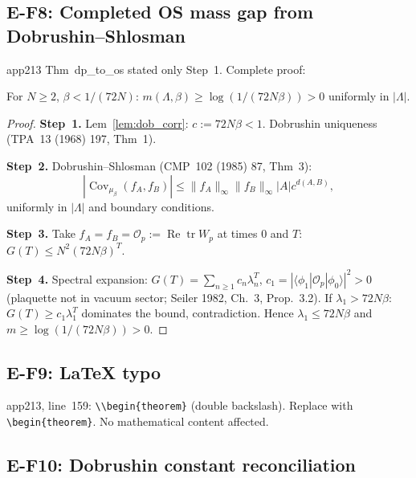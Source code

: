 \subsection{E-F8: Completed OS mass gap from Dobrushin--Shlosman}
\label{ssec:f8}

app213 Thm~dp\_to\_os stated only Step~1. Complete proof:

\begin{theorem}
\label{thm:dp_complete}
For $N\ge2$, $\beta<1/(72N)$: $m(\Lambda,\beta)\ge\log(1/(72N\beta))>0$ uniformly in $|\Lambda|$.
\end{theorem}

\begin{proof}
\textbf{Step~1.} Lem~\ref{lem:dob_corr}: $c:=72N\beta<1$. Dobrushin uniqueness (TPA~13 (1968) 197, Thm~1).

\textbf{Step~2.} Dobrushin--Shlosman (CMP~102 (1985) 87, Thm~3):
\begin{equation}
\label{eq:ds_decay}
  |\operatorname{Cov}_{\mu_\beta}(f_A,f_B)|\le\|f_A\|_\infty\|f_B\|_\infty|A|c^{d(A,B)},
\end{equation}
uniformly in $|\Lambda|$ and boundary conditions.

\textbf{Step~3.} Take $f_A=f_B=\mathcal{O}_p:=\operatorname{Re}\operatorname{tr}W_p$ at times $0$ and $T$: $G(T)\le N^2(72N\beta)^T$.

\textbf{Step~4.} Spectral expansion: $G(T)=\sum_{n\ge1}c_n\lambda_n^T$, $c_1=|\langle\phi_1|\mathcal{O}_p|\phi_0\rangle|^2>0$ (plaquette not in vacuum sector; Seiler 1982, Ch.~3, Prop.~3.2). If $\lambda_1>72N\beta$: $G(T)\ge c_1\lambda_1^T$ dominates the bound, contradiction. Hence $\lambda_1\le72N\beta$ and $m\ge\log(1/(72N\beta))>0$.
\end{proof}

\subsection{E-F9: LaTeX typo}
\label{ssec:f9}

app213, line~159: {\tt \textbackslash\textbackslash begin\{theorem\}} (double backslash). Replace with {\tt \textbackslash begin\{theorem\}}. No mathematical content affected.

\subsection{E-F10: Dobrushin constant reconciliation}
\label{ssec:f10}

